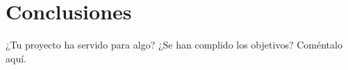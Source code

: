 \chapter{Conclusiones}
\label{sec:conclusiones}

¿Tu proyecto ha servido para algo? ¿Se han complido los objetivos? Coméntalo aquí.

